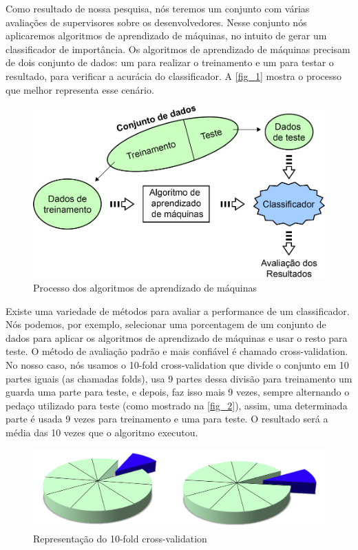 Como resultado de nossa pesquisa, nós teremos um conjunto com várias avaliações de supervisores sobre os desenvolvedores. Nesse conjunto nós aplicaremos algoritmos de aprendizado de máquinas, no intuito de gerar um classificador de importância. Os algoritmos de aprendizado de máquinas precisam de dois conjunto de dados: um para realizar o treinamento e um para testar o resultado, para verificar a acurácia do classificador. A \autoref{fig_1} mostra o processo que melhor representa esse cenário.

\begin{figure}[p]
	\centering
	\includegraphics[width=\textwidth]{figs/training-datasets.png}
	\caption{\label{fig_1}Processo dos algoritmos de aprendizado de máquinas}
\end{figure}

Existe uma variedade de métodos para avaliar a performance de um classificador. Nós podemos, por exemplo, selecionar uma porcentagem de um conjunto de dados para aplicar os algoritmos de aprendizado de máquinas e usar o resto para teste. O método de avaliação padrão e mais confiável é chamado cross-validation. No nosso caso, nós usamos o 10-fold cross-validation que divide o conjunto em 10 partes iguais (as chamadas folds), usa 9 partes dessa divisão para treinamento um guarda uma parte para teste, e depois, faz isso mais 9 vezes, sempre alternando o pedaço utilizado para teste (como mostrado na \autoref{fig_2}), assim, uma determinada parte é usada 9 vezes para treinamento e uma para teste. O resultado será a média das 10 vezes que o algoritmo executou.

\begin{figure}[p]
	\centering
	\includegraphics[width=\textwidth]{figs/10-fold-cross-validation.png}
	\caption{\label{fig_2}Representação do 10-fold cross-validation}
\end{figure}

